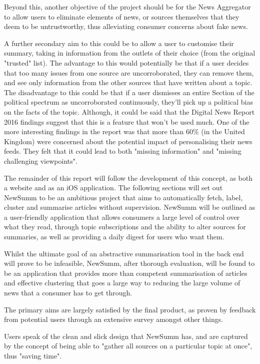 \documentclass[12pt]{article}
\begin{document}
Beyond this, another objective of the project should be for the News Aggregator to allow users to eliminate elements of news, or sources themselves that they deem to be untrustworthy, thus alleviating consumer concerns about fake news.

A further secondary aim to this could be to allow a user to customise their summary, taking in information from the outlets of their choice (from the original "trusted" list). The advantage to this would potentially be that if a user decides that too many issues from one source are uncorroborated, they can remove them, and see only information from the other sources that have written about a topic. The disadvantage to this could be that if a user dismisses an entire Section of the political spectrum as uncorroborated continuously, they'll pick up a political bias on the facts of the topic. Although, it could be said that the Digital News Report 2016 findings suggest that this is a feature that won't be used much. One of the more interesting findings in the report was that more than 60\% (in the United Kingdom) were concerned about the potential impact of personalising their news feeds. They felt that it could lead to both "missing information" and "missing challenging viewpoints".   

The remainder of this report will follow the development of this concept, as both a website and as an iOS application. The following sections will set out NewSumm to be an ambitious project that aims to automatically fetch, label, cluster and summarise articles without supervision. NewSumm will be outlined as a user-friendly application that allows consumers a large level of control over what they read, through topic subscriptions and the ability to alter sources for summaries, as well as providing a daily digest for users who want them.

Whilst the ultimate goal of an abstractive summarisation tool in the back end will prove to be infeasible, NewSumm, after thorough evaluation, will be found to be an application that provides more than competent summarisation of articles and effective clustering that goes a large way to reducing the large volume of news that a consumer has to get through.

The primary aims are largely satisfied by the final product, as proven by feedback from potential users through an extensive survey amongst other things.

Users speak of the clean and slick design that NewSumm has, and are captured by the concept of being able to "gather all sources on a particular topic at once", thus "saving time".
\end{document}
